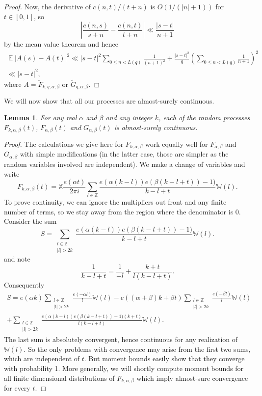 \documentclass[12pt, a4paper]{amsart}
\newtheorem{lemma}{Lemma}
\theoremstyle{remark}
\newcommand{\Z}{\ensuremath{\mathbb{Z}}}
\newcommand{\abs}[1]{\left|#1\right|}
\newcommand{\bW}{\mathbb{W}}
\newcommand{\bX}{\mathbb{X}}
\DeclareMathOperator{\E}{\mathbb{E}}
\begin{document}
\begin{proof}
Now, the derivative of $c(n,t)/(t+n)$ is $O(1/(|n|+1))$ for $t \in [0,1]$, so
\[
    \abs{
        \frac{c(n,s)}{s + n} - 
        \frac{c(n,t)}{t + n}
    } \ll \frac{\abs{s-t}}{n+1}
\]
by the mean value theorem
and hence
\begin{multline*}
    \E \abs{ A(s) - A(t)}^2
    \ll
        \abs{s-t}^2
        \sum_{0 \le n < L(q)}
            \frac{1}{(n+1)^2}
        +
        \frac{\abs{s-t}^2}{q}\left(\sum_{0 \le n < L(q)} \frac{1}{n+1}\right)^2
        \\
    \ll
        \abs{s-t}^2,
\end{multline*}
where $A = \tilde F_{k,q,\alpha,\beta}$ or $\tilde G_{q, \alpha, \beta}$.
\end{proof}
We will now show that all our processes are almost-surely continuous.
\begin{lemma}
    For any real $\alpha$ and $\beta$ and any integer $k$,
    each of the random processes $F_{k,\alpha,\beta}(t)$,
    $F_{\alpha,\beta}(t)$ and $G_{\alpha,\beta}(t)$ is almost-surely
    continuous. 
\end{lemma}
\begin{proof}
The calculations we give here for $F_{k,\alpha,\beta}$ work equally well
for $F_{\alpha,\beta}$ and $G_{\alpha,\beta}$ with simple modifications (in the latter case, those are simpler as the random variables involved are independent). We make a change of variables and write
\[
    F_{k, \alpha,\beta}(t) = \bX \frac{e(\alpha t)}{2\pi i}
    \sum_{l \in \Z}
    \frac{e(\alpha (k-l)) e(\beta(k - l + t)) - 1)}
    {k - l + t}
    \bW(l).
\]
To prove continuity, we can ignore the multipliers out front and any finite number of terms, so we stay away from the region where the
denominator is $0.$ Consider the sum
\[
    S = 
    \sum_{\substack{l \in \Z \\ |l| > 2k}}
    \frac{e(\alpha (k-l)) e(\beta(k - l + t)) - 1)}
    {k - l + t}
    \bW(l).
\]
and note
\[
    \frac{1}{k - l + t} = \frac{1}{-l} + \frac{k+t}{l(k - l + t)}.
\]
Consequently
\begin{multline*}
    S = 
    e(\alpha k)
    \sum_{\substack{l \in \Z \\ |l| > 2k}}
    \frac{e(-\alpha l)}{l}\bW(l)
    -
    e((\alpha + \beta)k + \beta t)
    \sum_{\substack{l \in \Z \\ |l| > 2k}}
    \frac{e(-\beta l)}{l} \bW(l)
    \\
    +
    \sum_{\substack{l \in \Z \\ |l| > 2k}}
    \frac{e(\alpha (k-l)) e(\beta(k - l + t)) - 1)(k+t)}
    {l(k - l + t)}
    \bW(l).
\end{multline*}
The last sum is absolutely convergent, hence continuous for
any realization of $\bW(l)$. So the only problems with convergence
may arise from the first two sums, which are independent of $t$. But moment bounds easily show that
they converge with probability 1. More generally, we will shortly compute
moment bounds for all finite dimensional distributions of
$F_{k,\alpha,\beta}$ which imply almost-sure convergence for every $t$.
\end{proof}
\end{document}
